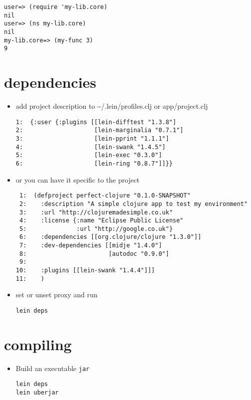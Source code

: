 \documentclass[11pt]{article}
\begin{document}
\begin{verbatim}
user=> (require 'my-lib.core)
nil
user=> (ns my-lib.core)
nil
my-lib.core=> (my-func 3)
9
\end{verbatim}
\section{dependencies}
\label{sec-4}

\begin{itemize}
\item add project description to \~{}/.lein/profiles.clj or app/project.clj


\begin{verbatim}
1:  {:user {:plugins [[lein-difftest "1.3.8"]
2:                    [lein-marginalia "0.7.1"]
3:                    [lein-pprint "1.1.1"]
4:                    [lein-swank "1.4.5"]
5:                    [lein-exec "0.3.0"]
6:                    [lein-ring "0.8.7"]]}}
\end{verbatim}
\item or you can have it specific to the project

\begin{verbatim}
 1:  (defproject perfect-clojure "0.1.0-SNAPSHOT"
 2:    :description "A simple clojure app to test my environment"
 3:    :url "http://clojuremadesimple.co.uk"
 4:    :license {:name "Eclipse Public License"
 5:              :url "http://google.co.uk"}
 6:    :dependencies [[org.clojure/clojure "1.3.0"]]
 7:    :dev-dependencies [[midje "1.4.0"]
 8:                       [autodoc "0.9.0"]
 9:  
10:    :plugins [[lein-swank "1.4.4"]]]
11:    )
\end{verbatim}
\end{itemize}

   
\begin{itemize}
\item set or unset proxy and run

\begin{verbatim}
lein deps
\end{verbatim}
\end{itemize}
\section{compiling}
\label{sec-5}

\begin{itemize}
\item Build an executable \texttt{jar}

\begin{verbatim}
lein deps
lein uberjar
\end{verbatim}
\end{itemize}
    
\end{document}
